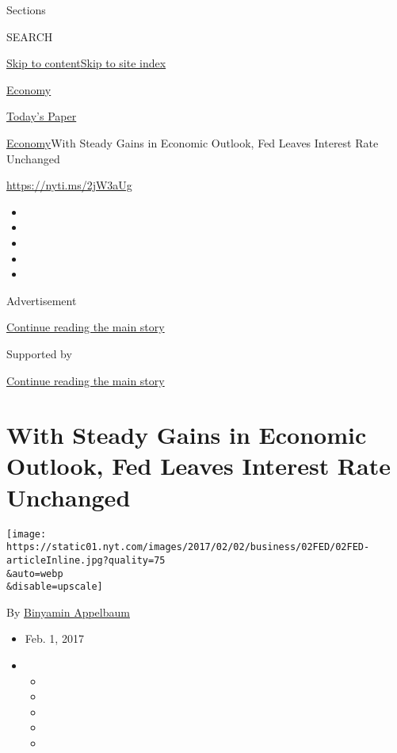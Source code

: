 Sections

SEARCH

\protect\hyperlink{site-content}{Skip to
content}\protect\hyperlink{site-index}{Skip to site index}

\href{https://www.nytimes.com/section/business/economy}{Economy}

\href{https://myaccount.nytimes.com/auth/login?response_type=cookie\&client_id=vi}{}

\href{https://www.nytimes.com/section/todayspaper}{Today's Paper}

\href{/section/business/economy}{Economy}\textbar{}With Steady Gains in
Economic Outlook, Fed Leaves Interest Rate Unchanged

\url{https://nyti.ms/2jW3aUg}

\begin{itemize}
\item
\item
\item
\item
\item
\end{itemize}

Advertisement

\protect\hyperlink{after-top}{Continue reading the main story}

Supported by

\protect\hyperlink{after-sponsor}{Continue reading the main story}

\hypertarget{with-steady-gains-in-economic-outlook-fed-leaves-interest-rate-unchanged}{%
\section{With Steady Gains in Economic Outlook, Fed Leaves Interest Rate
Unchanged}\label{with-steady-gains-in-economic-outlook-fed-leaves-interest-rate-unchanged}}

\texttt{[image: https://static01.nyt.com/images/2017/02/02/business/02FED/02FED-articleInline.jpg?quality=75\\\&auto=webp\\\&disable=upscale]}

By \href{http://www.nytimes.com/by/binyamin-appelbaum}{Binyamin
Appelbaum}

\begin{itemize}
\item
  Feb. 1, 2017
\item
  \begin{itemize}
  \item
  \item
  \item
  \item
  \item
  \end{itemize}
\end{itemize}

